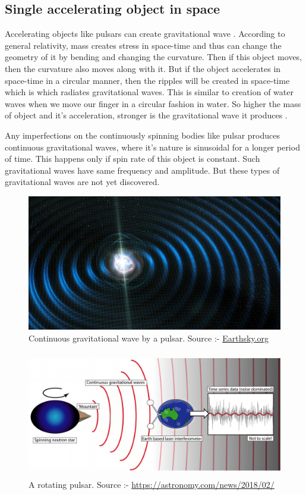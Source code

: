 \subsection{Single accelerating object in space}
 Accelerating objects like pulsars can create gravitational wave \cite{Creighton:2011zz}. According to general relativity, mass creates stress in space-time and thus can change the geometry of it by bending and changing the curvature. Then if this object moves, then the curvature also moves along with it. But if the object accelerates in space-time in a circular manner, then the ripples will be created in space-time which is which radiates gravitational waves. This is similar to creation of water waves when we move our finger in a circular fashion in water. So higher the mass of object and it's acceleration, stronger is the gravitational wave it produces \cite{Linear}.

Any imperfections on the continuously spinning bodies like pulsar produces continuous gravitational waves, where it's nature is sinusoidal for a longer period of time. This happens only if spin rate of this object is constant. Such gravitational waves have same frequency and amplitude. But these types of gravitational waves are not yet discovered.\\

\begin{figure}[h]
    \centering
    \includegraphics[scale = 0.4]{images.tex/continuous_gw.jpg}
    \caption{Continuous gravitational wave by a pulsar. Source :- \href{https://earthsky.org/space/gravitational-waves-single-neutron-stars-planck-einsteinhome}{Earthsky.org}}
\end{figure}

\begin{figure}[h]
    \centering
    \includegraphics[height=5.5cm]{images.tex/continuous_gw_by_imperfection.jpg}
    \caption{A rotating pulsar. Source :- \href{}{} \url{https://astronomy.com/news/2018/02/}}
\end{figure}

\pagebreak

